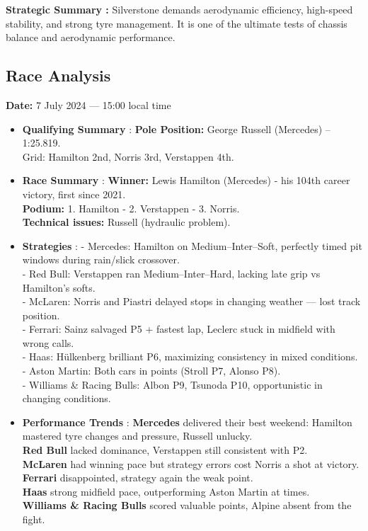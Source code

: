 \textbf{Strategic Summary :}
Silverstone demands aerodynamic efficiency, high-speed stability, and strong tyre management. 
It is one of the ultimate tests of chassis balance and aerodynamic performance.


\subsection{Race Analysis}

\textbf{Date:} 7 July 2024 — 15:00 local time 

\begin{itemize}
    \item \textbf{Qualifying Summary} : \textbf{Pole Position:} George Russell (Mercedes) – 1:25.819. \\
    Grid: Hamilton 2nd, Norris 3rd, Verstappen 4th.
    
    \item \textbf{Race Summary} : \textbf{Winner:} Lewis Hamilton (Mercedes) - his 104th career victory, first since 2021.\\
    \textbf{Podium:} 1. Hamilton - 2. Verstappen - 3. Norris.\\
    \textbf{Technical issues:} Russell (hydraulic problem).
    
    \item \textbf{Strategies} : 
    - Mercedes: Hamilton on Medium–Inter–Soft, perfectly timed pit windows during rain/slick crossover. \\
    - Red Bull: Verstappen ran Medium–Inter–Hard, lacking late grip vs Hamilton’s softs. \\
    - McLaren: Norris and Piastri delayed stops in changing weather — lost track position. \\
    - Ferrari: Sainz salvaged P5 + fastest lap, Leclerc stuck in midfield with wrong calls. \\
    - Haas: Hülkenberg brilliant P6, maximizing consistency in mixed conditions. \\
    - Aston Martin: Both cars in points (Stroll P7, Alonso P8). \\
    - Williams \& Racing Bulls: Albon P9, Tsunoda P10, opportunistic in changing conditions.
    
    \item \textbf{Performance Trends} : 
    \textbf{Mercedes} delivered their best weekend: Hamilton mastered tyre changes and pressure, Russell unlucky. \\
    \textbf{Red Bull} lacked dominance, Verstappen still consistent with P2. \\
    \textbf{McLaren} had winning pace but strategy errors cost Norris a shot at victory. \\
    \textbf{Ferrari} disappointed, strategy again the weak point. \\
    \textbf{Haas} strong midfield pace, outperforming Aston Martin at times. \\
    \textbf{Williams \& Racing Bulls} scored valuable points, Alpine absent from the fight.
    

\end{itemize}
